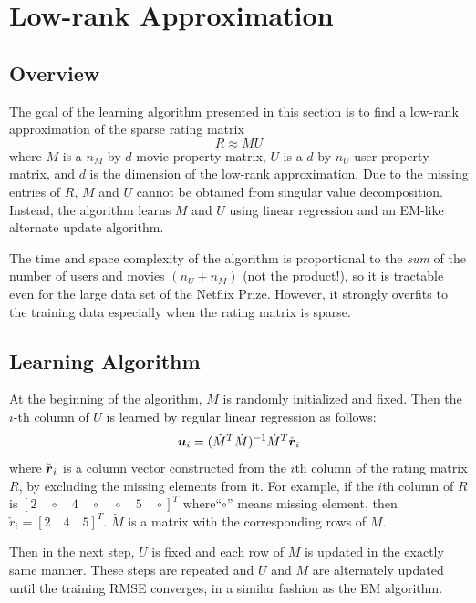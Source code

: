 \documentclass{article}
\begin{document}
\fi

\section{Low-rank Approximation}

\subsection{Overview}
The goal of the learning algorithm presented in this section is to find a low-rank approximation of the sparse rating matrix 
\begin{equation}
R \approx MU
\end{equation}
where $M$ is a $n_M$-by-$d$ movie property matrix, $U$ is a
$d$-by-$n_U$ user property matrix, and $d$ is the dimension of the
low-rank approximation. Due to the missing entries of $R$, $M$ and $U$
cannot be obtained from singular value decomposition. Instead, the
algorithm learns $M$ and $U$ using linear regression and an EM-like
alternate update algorithm.

The time and space complexity of the algorithm is proportional to
the \textit{sum} of the number of users and movies $(n_U+n_M)$ (not the product!), so it is tractable even for the large data set of the Netflix Prize. However, it strongly overfits to the training data especially when the rating matrix is sparse.

\subsection{Learning Algorithm}

At the beginning of the algorithm, $M$ is randomly initialized and
fixed. Then the $i$-th column of $U$ is learned by regular linear
regression as follows:
\begin{equation}
{\mbox{\boldmath $u$}}_i=(\check{M}^T\check{M})^{-1}\check{M}^T \check{{\mbox{\boldmath $r$}}}_i
\label{eq:lrem_core}
\end{equation}
where $\check{{\mbox{\boldmath $r$}}}_i$ is a column vector constructed from the $i$th column of the rating matrix $R$, by excluding the missing elements from it. For example, if the $i$th column of $R$ is $[2 \quad \circ \quad 4 \quad \circ \quad \circ \quad 5 \quad \circ]^T$ where``$\circ$'' means missing element, then $\check{r}_i = [2 \quad 4 \quad 5]^T$. $\check{M}$ is a matrix with the corresponding rows of $M$.

Then in the next step, $U$ is fixed and each row of $M$ is updated in
the exactly same manner. These steps are repeated and $U$ and $M$ are
alternately updated until the training RMSE converges, in a similar
fashion as the EM algorithm.
\end{document}

